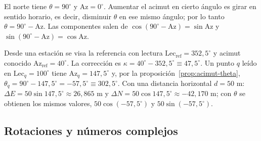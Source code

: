 \begin{demostracion}
El norte tiene \(\theta=90^\circ\) y \(\mathrm{Az}=0^\circ\). Aumentar el acimut en cierto ángulo
es girar en sentido horario, es decir, disminuir \(\theta\) en ese mismo ángulo; por lo tanto
\(\theta=90^\circ-\mathrm{Az}\). Las componentes salen de
\(\cos(90^\circ-\mathrm{Az})=\sin\mathrm{Az}\) y \(\sin(90^\circ-\mathrm{Az})=\cos\mathrm{Az}\).
\end{demostracion}

\begin{ejemplo}
Desde una estación se visa la referencia con lectura \(\mathrm{Lec}_{\text{ref}}=352{,}5^\circ\)
y acimut conocido \(\mathrm{Az}_{\text{ref}}=40^\circ\). La corrección es
\(\kappa=40^\circ-352{,}5^\circ\equiv47{,}5^\circ\). Un punto \(q\) leído en
\(\mathrm{Lec}_q=100^\circ\) tiene \(\mathrm{Az}_q=147{,}5^\circ\) y, por la
proposición~\ref{prop:acimut-theta}, \(\theta_q=90^\circ-147{,}5^\circ=-57{,}5^\circ\equiv302{,}5^\circ\).
Con una distancia horizontal \(d=50\) m:
\(\Delta E=50\sin147{,}5^\circ\approx26{,}865\) m y \(\Delta N=50\cos147{,}5^\circ\approx-42{,}170\) m;
con \(\theta\) se obtienen los mismos valores, \(50\cos(-57{,}5^\circ)\) y \(50\sin(-57{,}5^\circ)\).

\begin{center}
\end{center}
\end{ejemplo}

\subsection{Rotaciones y números complejos}\label{sec:rot-complejos}

